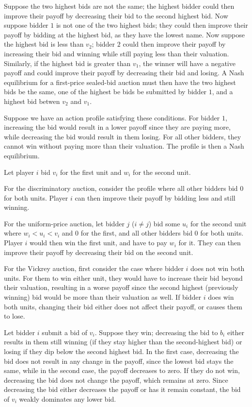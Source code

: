 \documentclass{article}
\begin{document}
\clearpage
\problem{}
Suppose the two highest bids are not the same; the highest bidder could then improve their payoff by decreasing their bid to the second highest bid. Now suppose bidder $1$ is not one of the two highest bids; they could then improve their payoff by bidding at the highest bid, as they have the lowest name. Now suppose the highest bid is less than $v_2$; bidder $2$ could then improve their payoff by increasing their bid and winning while still paying less than their valuation. Similarly, if the highest bid is greater than $v_1$, the winner will have a negative payoff and could improve their payoff by decreasing their bid and losing. A Nash equilibrium for a first-price sealed-bid auction must then have the two highest bids be the same, one of the highest be bids be submitted by bidder $1$, and a highest bid betwen $v_2$ and $v_1$.

Suppose we have an action profile satisfying these conditions. For bidder $1$, increasing the bid would result in a lower payoff since they are paying more, while decreasing the bid would result in them losing. For all other bidders, they cannot win without paying more than their valuation. The profile is then a Nash equilibrium.

\clearpage
\problem{}
Let player $i$ bid $v_i$ for the first unit and $w_i$ for the second unit.

For the discriminatory auction, consider the profile where all other bidders bid $0$ for both units. Player $i$ can then improve their payoff by bidding less and still winning.

For the uniform-price auction, let bidder $j$ ($i \neq j$) bid some $u_i$ for the second unit where $w_i < u_i < v_i$ and $0$ for the first, and all other bidders bid $0$ for both units. Player $i$ would then win the first unit, and have to pay $w_i$ for it. They can then improve their payoff by decreasing their bid on the second unit.

For the Vickrey auction, first consider the case where bidder $i$ does not win both units. For them to win either unit, they would have to increase their bid beyond their valuation, resulting in a worse payoff since the second highest (previously winning) bid would be more than their valuation as well. If bidder $i$ does win both units, changing their bid either does not affect their payoff, or causes them to lose.

\clearpage
\problem{}
Let bidder $i$ submit a bid of $v_i$. Suppose they win; decreasing the bid to $b_i$ either results in them still winning (if they stay higher than the second-highest bid) or losing if they dip below the second highest bid. In the first case, decreasing the bid does not result in any change in the payoff, since the lowest bid stays the same, while in the second case, the payoff decreases to zero. If they do not win, decreasing the bid does not change the payoff, which remains at zero. Since decreasing the bid either decreases the payoff or has it remain constant, the bid of $v_i$ weakly dominates any lower bid.
\end{document}
